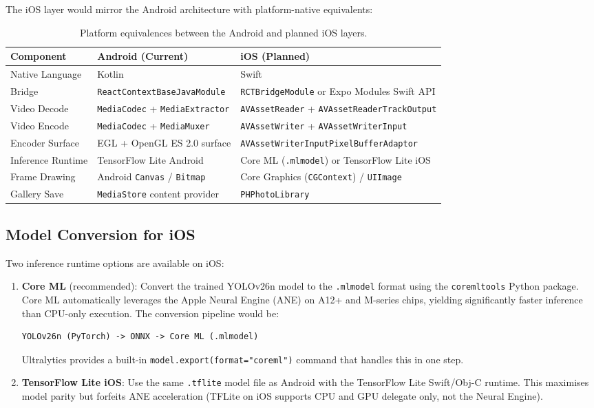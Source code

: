 \documentclass{zc-ust-hw}
\begin{document}
The iOS layer would mirror the Android architecture with platform-native equivalents:

\begin{table}[H]
\centering
\begin{tabularx}{\textwidth}{lXX}
\toprule
\textbf{Component} & \textbf{Android (Current)} & \textbf{iOS (Planned)} \\
\midrule
Native Language    & Kotlin                       & Swift \\
Bridge             & \texttt{ReactContextBaseJavaModule} & \texttt{RCTBridgeModule} or Expo Modules Swift API \\
Video Decode       & \texttt{MediaCodec} + \texttt{MediaExtractor} & \texttt{AVAssetReader} + \texttt{AVAssetReaderTrackOutput} \\
Video Encode       & \texttt{MediaCodec} + \texttt{MediaMuxer}     & \texttt{AVAssetWriter} + \texttt{AVAssetWriterInput} \\
Encoder Surface    & EGL + OpenGL ES 2.0 surface  & \texttt{AVAssetWriterInputPixelBufferAdaptor} \\
Inference Runtime  & TensorFlow Lite Android      & Core ML (\texttt{.mlmodel}) or TensorFlow Lite iOS \\
Frame Drawing      & Android \texttt{Canvas} / \texttt{Bitmap} & Core Graphics (\texttt{CGContext}) / \texttt{UIImage} \\
Gallery Save       & \texttt{MediaStore} content provider & \texttt{PHPhotoLibrary} \\
\bottomrule
\end{tabularx}
\caption{Platform equivalences between the Android and planned iOS layers.}
\end{table}

\subsection{Model Conversion for iOS}

Two inference runtime options are available on iOS:

\begin{enumerate}
    \item \textbf{Core ML} (recommended): Convert the trained YOLOv26n model to the \texttt{.mlmodel} format using the \texttt{coremltools} Python package.
    Core ML automatically leverages the Apple Neural Engine (ANE) on A12+ and M-series chips, yielding significantly faster inference than CPU-only execution.
    The conversion pipeline would be:
\begin{lstlisting}[language={}, caption={Core ML model conversion pipeline.}]
YOLOv26n (PyTorch) -> ONNX -> Core ML (.mlmodel)
\end{lstlisting}
    Ultralytics provides a built-in \texttt{model.export(format="coreml")} command that handles this in one step.

    \item \textbf{TensorFlow Lite iOS}: Use the same \texttt{.tflite} model file as Android with the TensorFlow Lite Swift/Obj-C runtime.
    This maximises model parity but forfeits ANE acceleration (TFLite on iOS supports CPU and GPU delegate only, not the Neural Engine).
\end{enumerate}
\end{document}
